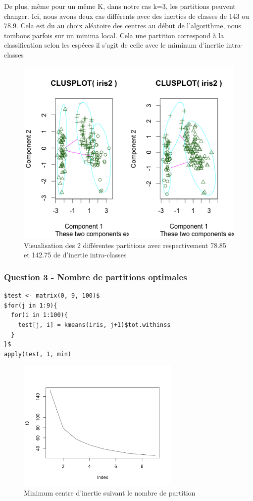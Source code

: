 \documentclass{article}\usepackage[]{graphicx}\usepackage[]{color}
\begin{document}
De plus, même pour un même K, dans notre cas k=3, les partitions peuvent changer. Ici, nous avons deux cas différents avec des inerties de classes de 143 ou 78.9. Cela est du au choix aléatoire des centres au début de l'algorithme, nous tombons parfois sur un minima local. Cela une partition correspond à la classification selon les espéces il s'agit de celle avec le miminum d'inertie intra-classes
\begin{figure}
\includegraphics[width=\textwidth]{ex2_iris_2.png}
\caption{Visualisation des 2 différentes partitions avec respectivement 78.85 et 142.75 de d'inertie intra-classes}
\end{figure}
 
\subsubsection*{Question 3 - Nombre de partitions optimales}

\begin{verbatim}
$test <- matrix(0, 9, 100)$
$for(j in 1:9){
  for(i in 1:100){
    test[j, i] = kmeans(iris, j+1)$tot.withinss
  }
}$
apply(test, 1, min)
\end{verbatim}

\begin{figure}
\includegraphics[width=0.7\textwidth]{ex2_iris_3.png}
\caption{Minimum centre d'inertie suivant le nombre de partition}
\end{figure}
\end{document}
